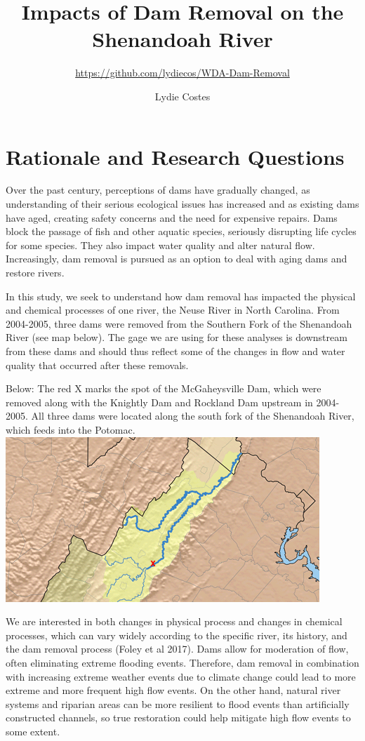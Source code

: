 \documentclass[
  12pt,
]{article}
\title{Impacts of Dam Removal on the Shenandoah River}
\subtitle{\url{https://github.com/lydiecos/WDA-Dam-Removal}}
\author{Lydie Costes}
\date{}
\begin{document}
\maketitle

\newpage

\hypertarget{rationale-and-research-questions}{%
\section{Rationale and Research
Questions}\label{rationale-and-research-questions}}

Over the past century, perceptions of dams have gradually changed, as
understanding of their serious ecological issues has increased and as
existing dams have aged, creating safety concerns and the need for
expensive repairs. Dams block the passage of fish and other aquatic
species, seriously disrupting life cycles for some species. They also
impact water quality and alter natural flow. Increasingly, dam removal
is pursued as an option to deal with aging dams and restore rivers.

In this study, we seek to understand how dam removal has impacted the
physical and chemical processes of one river, the Neuse River in North
Carolina. From 2004-2005, three dams were removed from the Southern Fork
of the Shenandoah River (see map below). The gage we are using for these
analyses is downstream from these dams and should thus reflect some of
the changes in flow and water quality that occurred after these
removals.

Below: The red X marks the spot of the McGaheysville Dam, which were
removed along with the Knightly Dam and Rockland Dam upstream in
2004-2005. All three dams were located along the south fork of the
Shenandoah River, which feeds into the Potomac.
\includegraphics{../Figures-and-Maps/mcgaheysvilledam.png}

We are interested in both changes in physical process and changes in
chemical processes, which can vary widely according to the specific
river, its history, and the dam removal process (Foley et al 2017). Dams
allow for moderation of flow, often eliminating extreme flooding events.
Therefore, dam removal in combination with increasing extreme weather
events due to climate change could lead to more extreme and more
frequent high flow events. On the other hand, natural river systems and
riparian areas can be more resilient to flood events than artificially
constructed channels, so true restoration could help mitigate high flow
events to some extent.
\end{document}
